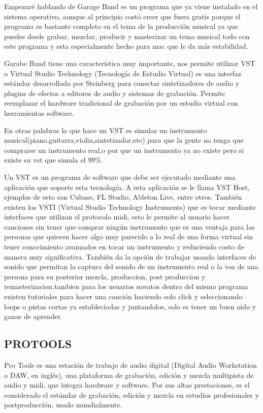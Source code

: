 Empezaré hablando de Garage Band es un programa que ya
viene instalado en el sistema operativo, aunque al principio
costó creer que fuera gratis porque el programa es bastante
completo en el tema de la producción musical ya que puedes
desde grabar, mezclar, producir y masterizar un tema musical
todo con este programa y esta especialmente hecho para mac
que le da más estabilidad.

Garabe Band tiene una característica muy importante, nos
permite utilizar VST o Virtual Studio Technology (Tecnología
de Estudio Virtual) es una interfaz estándar desarrollada por
Steinberg para conectar sintetizadores de audio y plugins de
efectos a editores de audio y sistemas de grabación. Permite
reemplazar el hardware tradicional de grabación por un estudio
virtual con herramientas software.

En otras palabras lo que hace un VST es simular un instrumento
musical(piano,guitarra,violin,sintetizador,etc) para que la gente
no tenga que comprarse un instrumento real,o por que un
instrumento ya no existe pero si existe su vst que simula el 99\%.

Un VST es un programa de software que debe ser ejecutado
mediante una aplicación que soporte esta tecnología. A esta
aplicación se le llama VST Host, ejemplos de esto son Cubase,
FL Studio, Ableton Live, entre otros.
También existen los VSTI (Virtual Studio Technology
Instruments) que es tocar mediante interfaces que utilizan el
protocolo midi, esto le permite al usuario hacer canciones sin
tener que comprar ningún instrumento que es una ventaja para
las personas que quieren hacer algo muy parecido a lo real de
una forma virtual sin tener conocimiento avanzados en tocar un
instrumento y reduciendo costo de manera muy significativa.
También da la opción de trabajar usando interfaces de sonido
que permitan la captura del sonido de un instrumento real o la
voz de una persona para su posterior mezcla, produccion, post
produccion y remasterizacion.tambien para los usuarios novatos
dentro del mismo programa existen tutoriales para hacer una
canción haciendo solo click y seleccionando loops o pistas cortas
ya estableciodas y juntandolos, solo es tener un buen oido y
ganas de aprender.

\subsection*{PROTOOLS}

Pro Tools es una estación de trabajo de audio digital (Digital
Audio Workstation o DAW, en inglés), una plataforma de
grabación, edición y mezcla multipista de audio y midi, que
integra hardware y software. Por sus altas prestaciones, es el
considerado el estándar de grabación, edición y mezcla en
estudios profesionales y postproducción, usado mundialmente.

